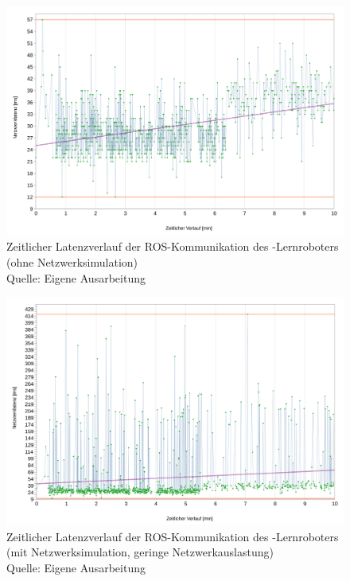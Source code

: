 \begin{figure}[htb]
	\centering
	\includegraphics[width=1.04\textwidth]{images/ergebnisse/Messung_der_ROS_Kommunikation_App_und_keine_Netzwerksimulation}
	\caption[Zeitlicher Latenzverlauf der ROS-Kommunikation des -Lernroboters (ohne Netzwerksimulation)]{Zeitlicher Latenzverlauf der ROS-Kommunikation des -Lernroboters (ohne Netzwerksimulation)\\Quelle: Eigene Ausarbeitung}
	\label{fig:measurement_robot_ros_without_network_simulation}
\end{figure}
\FloatBarrier

\begin{figure}[htb]
	\centering
	\includegraphics[width=1.04\textwidth]{images/ergebnisse/ROS_App_und_mit_Netzwerksimulation}
	\caption[Zeitlicher Latenzverlauf der ROS-Kommunikation des -Lernroboters (mit Netzwerksimulation, geringe Netzwerkauslastung)]{Zeitlicher Latenzverlauf der ROS-Kommunikation des -Lernroboters (mit Netzwerksimulation, geringe Netzwerkauslastung)\\Quelle: Eigene Ausarbeitung}
	\label{fig:measurement_robot_ros_with_network_simulation_low_network_traffic}
\end{figure}
\FloatBarrier

